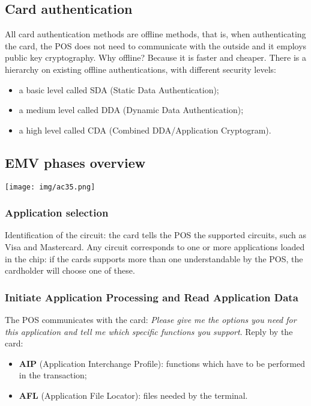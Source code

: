 \documentclass[a4paper, 10pt, titlepage]{article}
\begin{document}
\subsection{Card authentication}
All card authentication methods are offline methods, that is, when authenticating the card, the POS does not need to communicate with the outside and it employs public key cryptography. Why offline? Because it is faster and cheaper. There is a hierarchy on existing offline authentications, with different security levels:
\begin{itemize}
\item a basic level called SDA (Static Data Authentication);
\item a medium level called DDA (Dynamic Data Authentication);
\item a high level called CDA (Combined DDA/Application Cryptogram).
\end{itemize}

\subsection{EMV phases overview}
\begin{center}
\texttt{[image: img/ac35.png]}
\end{center}

\subsubsection{Application selection}
Identification of the circuit: the card tells the POS the supported circuits, such as Visa and Mastercard. Any circuit corresponds to one or more applications loaded in the chip: if the cards supports more than one understandable by the POS, the cardholder will choose one of these.

\subsubsection{Initiate Application Processing and Read Application Data}
The POS communicates with the card: \textit{Please give me the options you need for this application and tell me which specific functions you support}. Reply by the card:
\begin{itemize}
\item \textbf{AIP} (Application Interchange Profile): functions which have to be performed in the transaction;
\item \textbf{AFL} (Application File Locator): files needed by the terminal.
\end{itemize}
\end{document}
